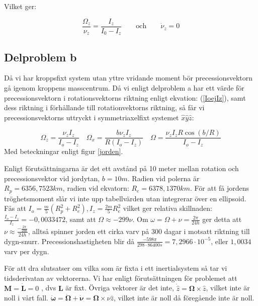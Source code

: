 \documentclass[12pt,a4paper]{article}
\begin{document}
	Vilket ger:
	
	\begin{equation}
		\frac{\Omega_z}{\nu_z} = \frac{I_z}{I_0 - I_z}
		\hspace{24pt}
		\mathrm{och}
		\hspace{24pt}
		\dot{\nu}_z = 0
\label{IoejIz}
	\end{equation}
	\subsection{Delproblem b}
	Då vi har kroppsfixt system utan yttre vridande moment bör precessionsvektorn
	gå igenom kroppens masscentrum.  Då vi enligt delproblem a har ett värde för
	precessionsvektorn i rotationsvektorns riktning enligt ekvation: (\ref{IoejIz}), samt dess
	riktning i förhållande till rotationvektorns riktning, så får vi precessionsvektorns
	uttryckt i symmetriaxelfixt systemet $\hat{x}\hat{y}\hat{z}$:
	
	\begin{equation*}
		\Omega_z = \frac{\nu_z I_z}{I_o-I_z}
		\hspace{12pt}
		\Omega_x = \frac{b \nu_z I_z}{R(I_o-I_z)}
		\hspace{12pt}
		\Omega = \frac{\nu_z I_z R \cos(b/R)}{I_o-I_z}
	\end{equation*}
	Med beteckningar enligt figur \ref{jorden}.

	Enligt förutsättningarna är det ett avstånd på 10 meter mellan rotation och
	precessionsvektor vid jordytan, $b=10m$. Radien vid polerna är $R_p= 6356,7523 km$,
	radien vid ekvatorn: $R_e=6378,1370 km$. För att få jordens tröghetsmoment slår vi
	inte upp tabellvärden utan integrerar över en ellipsoid.
	Fås att $I_o = \frac{m}{5}(R_p^2+R_e^2), I_z = \frac{2m}{5}R_e^2$ vilket ger relativa
	skillnaden: $\frac{I_o-I_z}{I_z} = -0,0033472$, samt att $\Omega \approx -299\nu$. Om
	$\omega=\Omega+\nu = \frac{2\pi}{24h}$ ger detta att
	$\nu \approx \frac{-\frac{2\pi}{298}}{24h}$, alltså spinner jorden ett cirka varv på 300
	dagar i motsatt riktning till dygn-snurr. Precessionshastigheten blir då $\frac{-598\pi}{298 \cdot 86400 s} =7,2966 \cdot 10^{-5}$, eller $1,0034$ varv per dygn.

	
	För att dra slutsatser om vilka som är fixta i ett inertialsystem så tar vi tidsderivatan av
	vektorerna. Vi har enligt förutsättningen för problemet att $\mathbf{M} = \dot{\mathbf{L}}=0$ ,
	dvs $\mathbf{L}$ är fixt. Övriga vektorer är det inte, $\dot{\hat{z}}=\boldsymbol{\Omega} \times \hat{z}$,
	vilket inte är noll i vårt fall. $\dot{\boldsymbol{\omega}} = \dot{\boldsymbol{\Omega}}+\dot{\boldsymbol{\nu}} =
	\boldsymbol{\Omega} \times \nu \hat{z}$, vilket inte är noll då föregående inte är noll.
	
\end{document}
